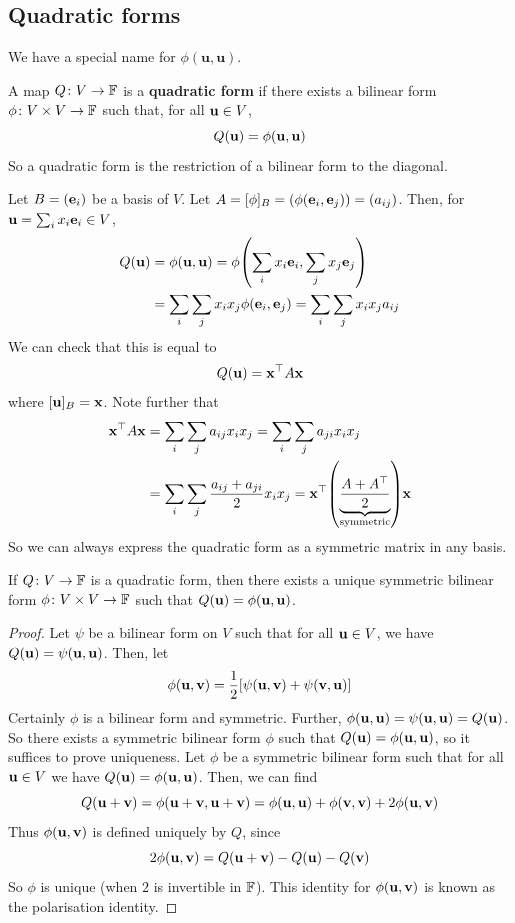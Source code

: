 \documentclass[a4paper,11pt]{article}
\begin{document}
\subsection{Quadratic forms}
We have a special name for $ \phi(\mathbf{u},\mathbf{u}) $. 
\begin{definition}
	A map \( Q \colon V \to {\mathbb{F}} \) is a \textbf{quadratic form} if there exists a bilinear form \( \phi \colon V \times V \to {\mathbb{F}} \) such that, for all \( {\bf u} \in V \),
	\[
		Q({\bf u}) = \phi({\bf u},{\bf u})
	\]
	So a quadratic form is the restriction of a bilinear form to the diagonal.
\end{definition}
\begin{remark}
	Let \( B = ({\bf e}_i) \) be a basis of \( V \).
	Let \( A = [\phi]_B = (\phi({\bf e}_i, {\bf e}_j)) = (a_{ij}) \).
	Then, for \( {\bf u} = \sum_i x_i {\bf e}_i \in V \),
	\begin{align*}
		Q({\bf u}) &= \phi({\bf u},{\bf u}) = \phi\qty(\sum_i x_i {\bf e}_i, \sum_j x_j {\bf e}_j) \\ 
		&= \sum_i \sum_j x_i x_j \phi({\bf e}_i, {\bf e}_j) = \sum_i \sum_j x_i x_j a_{ij}
	\end{align*}
	We can check that this is equal to
	\[
		Q({\bf u}) = {\bf x}^\top A {\bf x}
	\]
	where \( [{\bf u}]_B = {\bf x} \).
	Note further that
	\begin{align*}
		\bfx^\top A \bfx &= \sum_i \sum_j a_{ij} x_i x_j = \sum_i \sum_j a_{ji} x_i x_j \\ 
		&= \sum_i \sum_j \frac{a_{ij} + a_{ji}}{2} x_i x_j = \bfx^\top \qty(\underbrace{\frac{A + A^\top}{2}}_{\mathclap{\text{symmetric}}})\bfx
	\end{align*}
	So we can always express the quadratic form as a symmetric matrix in any basis.
\end{remark}
\begin{proposition}
	If \( Q \colon V \to {\mathbb{F}} \) is a quadratic form, then there exists a unique symmetric bilinear form \( \phi \colon V \times V \to {\mathbb{F}} \) such that \( Q({\bf u}) = \phi({\bf u},{\bf u}) \).
\end{proposition}
\begin{proof}
	Let \( \psi \) be a bilinear form on \( V \) such that for all \( {\bf u} \in V \), we have \( Q({\bf u}) = \psi({\bf u},{\bf u}) \).
	Then, let
	\[
		\phi({\bf u},{\bf v}) = \frac{1}{2}\qty[\psi({\bf u},{\bf v}) + \psi({\bf v},{\bf u})]
	\]
	Certainly \( \phi \) is a bilinear form and symmetric.
	Further, \( \phi({\bf u},{\bf u}) = \psi({\bf u},{\bf u}) = Q({\bf u}) \).
	So there exists a symmetric bilinear form \( \phi \) such that \( Q({\bf u}) = \phi({\bf u},{\bf u}) \), so it suffices to prove uniqueness.
	Let \( \phi \) be a symmetric bilinear form such that for all \( {\bf u} \in V \) we have \( Q({\bf u}) = \phi({\bf u},{\bf u}) \).
	Then, we can find
	\[
		Q({\bf u} + {\bf v}) = \phi({\bf u} + {\bf v}, {\bf u} + {\bf v}) = \phi({\bf u},{\bf u}) + \phi({\bf v},{\bf v}) + 2\phi({\bf u},{\bf v})
	\]
	Thus \( \phi({\bf u},{\bf v}) \) is defined uniquely by \( Q \), since
	\[
		2 \phi({\bf u},{\bf v}) = Q({\bf u}+{\bf v}) - Q({\bf u}) - Q({\bf v})
	\]
	So \( \phi \) is unique (when \( 2 \) is invertible in \( {\mathbb{F}} \)).
	This identity for \( \phi({\bf u},{\bf v}) \) is known as the polarisation identity.
\end{proof}
\end{document}

